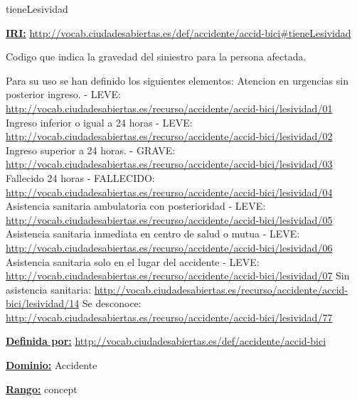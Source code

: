 \begin{mybox}{tieneLesividad}
\begin{flushleft}
\underline{\textbf{IRI:}}
\url{http://vocab.ciudadesabiertas.es/def/accidente/accid-bici#tieneLesividad}
\newline

Codigo que indica la gravedad del siniestro para la persona afectada.
\newline

Para su uso se han definido los siguientes elementos:
 Atencion en urgencias sin posterior ingreso. - LEVE:
\newline \url{http://vocab.ciudadesabiertas.es/recurso/accidente/accid-bici/lesividad/01}
 Ingreso inferior o igual a 24 horas - LEVE:
\newline \url{http://vocab.ciudadesabiertas.es/recurso/accidente/accid-bici/lesividad/02}
 Ingreso superior a 24 horas. - GRAVE:
\newline \url{http://vocab.ciudadesabiertas.es/recurso/accidente/accid-bici/lesividad/03}
 Fallecido 24 horas - FALLECIDO:
\newline \url{http://vocab.ciudadesabiertas.es/recurso/accidente/accid-bici/lesividad/04}
 Asistencia sanitaria ambulatoria con posterioridad - LEVE:
\newline \url{http://vocab.ciudadesabiertas.es/recurso/accidente/accid-bici/lesividad/05}
 Asistencia sanitaria inmediata en centro de salud o mutua - LEVE:
\newline \url{http://vocab.ciudadesabiertas.es/recurso/accidente/accid-bici/lesividad/06}
 Asistencia sanitaria solo en el lugar del accidente - LEVE:
\newline \url{http://vocab.ciudadesabiertas.es/recurso/accidente/accid-bici/lesividad/07}
 Sin asistencia sanitaria:
\newline \url{http://vocab.ciudadesabiertas.es/recurso/accidente/accid-bici/lesividad/14}
 Se desconoce:
\newline \url{http://vocab.ciudadesabiertas.es/recurso/accidente/accid-bici/lesividad/77}
\newline


\underline{\textbf{Definida por:}}
\newline \url{http://vocab.ciudadesabiertas.es/def/accidente/accid-bici}
\newline

\underline{\textbf{Dominio:}} 
\newline Accidente
\newline

\underline{\textbf{Rango:}}
\newline concept
\newline

\end{flushleft}
\end{mybox}
